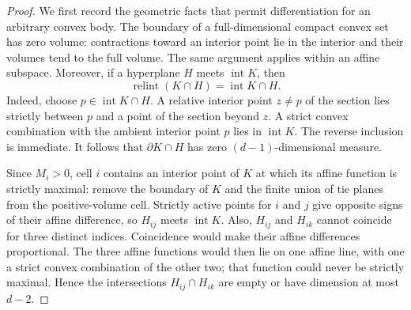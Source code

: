\begin{proof}
We first record the geometric facts that permit differentiation for an
arbitrary convex body. The boundary of a full-dimensional compact convex
set has zero volume: contractions toward an interior point lie in the
interior and their volumes tend to the full volume. The same argument
applies within an affine subspace. Moreover, if a hyperplane $H$ meets
$\operatorname{int}K$, then
\[
 \operatorname{relint}(K\cap H)=\operatorname{int}K\cap H.
\]
Indeed, choose $p\in\operatorname{int}K\cap H$. A relative interior point
$z\ne p$ of the section lies strictly between $p$ and a point of the
section beyond $z$. A strict convex combination with the ambient interior
point $p$ lies in $\operatorname{int}K$. The reverse inclusion is immediate.
It follows that $\partial K\cap H$ has zero $(d-1)$-dimensional measure.

Since $M_i>0$, cell $i$ contains an interior point of $K$ at which its
affine function is strictly maximal: remove the boundary of $K$ and the
finite union of tie planes from the positive-volume cell. Strictly active
points for $i$ and $j$ give opposite signs of their affine difference, so
$H_{ij}$ meets $\operatorname{int}K$. Also, $H_{ij}$ and $H_{ik}$ cannot
coincide for three distinct indices. Coincidence would make their affine
differences proportional. The three affine functions would then lie on
one affine line, with one a strict convex combination of the other two;
that function could never be strictly maximal. Hence the intersections
$H_{ij}\cap H_{ik}$ are empty or have dimension at most $d-2$.


\end{proof}

